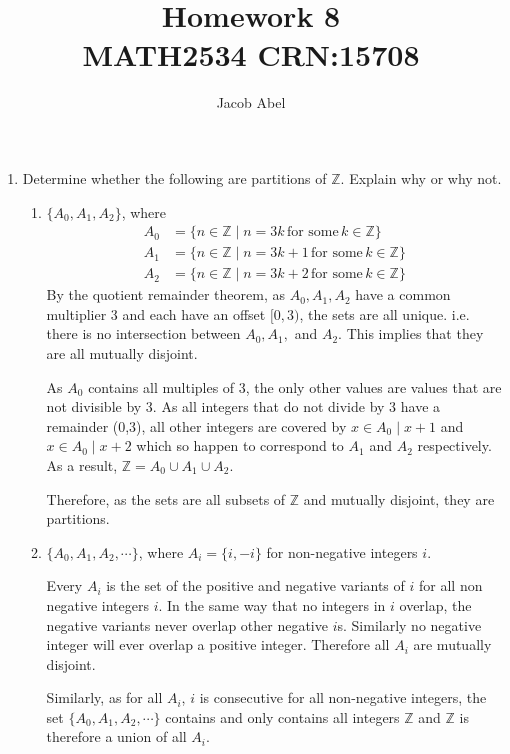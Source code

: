 \documentclass[12pt,letterpaper,titlepage]{article}
\author{Jacob Abel}
\title{	Homework 8
	\\\large MATH2534 CRN:15708
}
\begin{document}
\maketitle
\begin{raggedright}

\begin{enumerate}
\item Determine whether the following are partitions of $\mathbb{Z}$. Explain why or why not.
\begin{enumerate}[label=(\alph*)]
\item $\{A_0, A_1, A_2\}$, where
\begin{align*}
   A_0 &= \{n\in\mathbb{Z}\mid n = 3k   \, \text{for some}\, k\in\mathbb{Z}\}
\\ A_1 &= \{n\in\mathbb{Z}\mid n = 3k+1 \, \text{for some}\, k\in\mathbb{Z}\}
\\ A_2 &= \{n\in\mathbb{Z}\mid n = 3k+2 \, \text{for some}\, k\in\mathbb{Z}\}
\end{align*}
By the quotient remainder theorem, as $A_0, A_1, A_2$ have a common multiplier 3 and each have an offset $[0, 3)$, the sets are all unique. i.e. there is no intersection between $A_0, A_1,$ and $A_2$. This implies that they are all mutually disjoint.

As $A_0$ contains all multiples of 3, the only other values are values that are not divisible by 3. As all integers that do not divide by 3 have a remainder (0,3), all other integers are covered by ${x \in A_0 \mid x+1}$ and ${x \in A_0 \mid x+2}$ which so happen to correspond to $A_1$ and $A_2$ respectively. As a result, $\mathbb{Z} = A_0\cup A_1\cup A_2$.

Therefore, as the sets are all subsets of $\mathbb{Z}$ and mutually disjoint, they are partitions.

\item $\{A_0, A_1, A_2, \cdots\}$, where $A_i = \{i, -i\}$ for non-negative integers $i$.

Every $A_i$ is the set of the positive and negative variants of $i$ for all non negative integers $i$. In the same way that no integers in $i$ overlap, the negative variants never overlap other negative $i$s. Similarly no negative integer will ever overlap a positive integer. Therefore all $A_i$ are mutually disjoint.

Similarly, as for all $A_i$, $i$ is consecutive for all non-negative integers, the set $\{A_0, A_1, A_2, \cdots\}$ contains and only contains all integers $\mathbb{Z}$ and $\mathbb{Z}$ is therefore a union of all $A_i$.


\end{enumerate}
\end{enumerate}
\end{raggedright}
\end{document}
